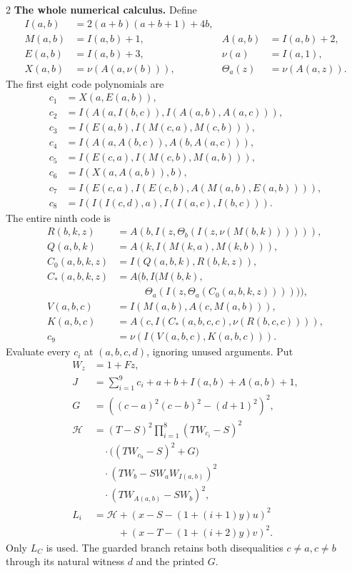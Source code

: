 \documentclass[10pt,letterpaper]{article}
\newcommand{\HH}{\mathcal H}
\begin{document}
\begin{multicols}{2}
\textbf{The whole numerical calculus.} Define
\[
\begin{aligned}
I(a,b)&=2(a+b)(a+b+1)+4b,\\
M(a,b)&=I(a,b)+1,&A(a,b)&=I(a,b)+2,\\
E(a,b)&=I(a,b)+3,&\nu(a)&=I(a,1),\\
X(a,b)&=\nu(A(a,\nu(b))),&\Theta_a(z)&=\nu(A(a,z)).
\end{aligned}
\]
The first eight code polynomials are
\[
\begin{aligned}
c_1&=X(a,E(a,b)),\\
c_2&=I(A(a,I(b,c)),I(A(a,b),A(a,c))),\\
c_3&=I(E(a,b),I(M(c,a),M(c,b))),\\
c_4&=I(A(a,A(b,c)),A(b,A(a,c))),\\
c_5&=I(E(c,a),I(M(c,b),M(a,b))),\\
c_6&=I(X(a,A(a,b)),b),\\
c_7&=I(E(c,a),I(E(c,b),A(M(a,b),E(a,b)))),\\
c_8&=I(I(I(c,d),a),I(I(a,c),I(b,c))).
\end{aligned}
\]
The entire ninth code is
\[
\begin{aligned}
R(b,k,z)&=A(b,I(z,\Theta_b(I(z,\nu(M(b,k)))))),\\
Q(a,b,k)&=A(k,I(M(k,a),M(k,b))),\\
C_0(a,b,k,z)&=I(Q(a,b,k),R(b,k,z)),\\
C_*(a,b,k,z)&=A\bigl(b,I(M(b,k),\\[-2pt]
&\hspace{34pt}\Theta_a(I(z,\Theta_a(C_0(a,b,k,z)))))\bigr),\\
V(a,b,c)&=I(M(a,b),A(c,M(a,b))),\\
K(a,b,c)&=A(c,I(C_*(a,b,c,c),\nu(R(b,c,c)))),\\
c_9&=\nu(I(V(a,b,c),K(a,b,c))).
\end{aligned}
\]
Evaluate every $c_i$ at $(a,b,c,d)$, ignoring unused arguments. Put
\[
\begin{aligned}
W_z&=1+Fz,\\
J&=\sum_{i=1}^9c_i+a+b+I(a,b)+A(a,b)+1,\\
G&=((c-a)^2(c-b)^2-(d+1)^2)^2,\\
\HH&=(T-S)^2\prod_{i=1}^8(TW_{c_i}-S)^2\\
&\quad\cdot\bigl((TW_{c_9}-S)^2+G\bigr)\\
&\quad\cdot(TW_b-SW_aW_{I(a,b)})^2\\
&\quad\cdot(TW_{A(a,b)}-SW_b)^2,\\
L_i&=\HH+(x-S-(1+(i+1)y)u)^2\\
&\hspace{29pt}+(x-T-(1+(i+2)y)v)^2.
\end{aligned}
\]
Only $L_C$ is used. The guarded branch retains both disequalities
$c\ne a,c\ne b$ through its natural witness $d$ and the printed $G$.


\end{multicols}
\end{document}

